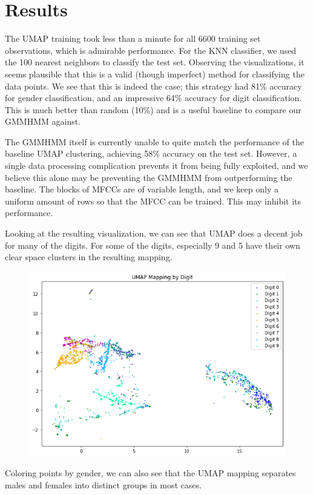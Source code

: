 \documentclass[11pt]{article}
\newcommand{\0}{{\vec  0 }}
\newcommand{\1}{{\mathbbm{  1} }}
\begin{document}
    \section{Results}
    The UMAP training took less than a minute for all 6600 training set observations, which is admirable performance. For the KNN classifier, we used the 100 nearest neighbors to classify the test set. Observing the visualizations, it seems plausible that this is a valid (though imperfect) method for classifying the data points. We see that this is indeed the case; this strategy had 81\% accuracy for gender classification, and an impressive 64\% accuracy for digit classification. This is much better than random (10\%) and is a useful baseline to compare our GMMHMM against. 
    
    The GMMHMM itself is currently unable to quite match the performance of the baseline UMAP clustering, achieving 58\% accuracy on the test set. However, a single data processing complication prevents it from being fully exploited, and we believe this alone may be preventing the GMMHMM from outperforming the baseline. The blocks of MFCCs are of variable length, and we keep only a uniform amount of rows so that the MFCC can be trained. This may inhibit its performance.
    
    Looking at the resulting visualization, we can see that UMAP does a decent job for many of the digits. For some of the digits, especially 9 and 5 have their own clear space clusters in the resulting mapping. 
    
    
    \begin{figure}
        \centering
        \includegraphics[width=0.7\linewidth]{UMAPdigitcomparison}
        \caption{}
        \label{fig:umapdigitcomparison}
    \end{figure}
    
    
    Coloring points by gender, we can also see that the UMAP mapping separates males and females into distinct groups in most cases. 
   
\end{document}
